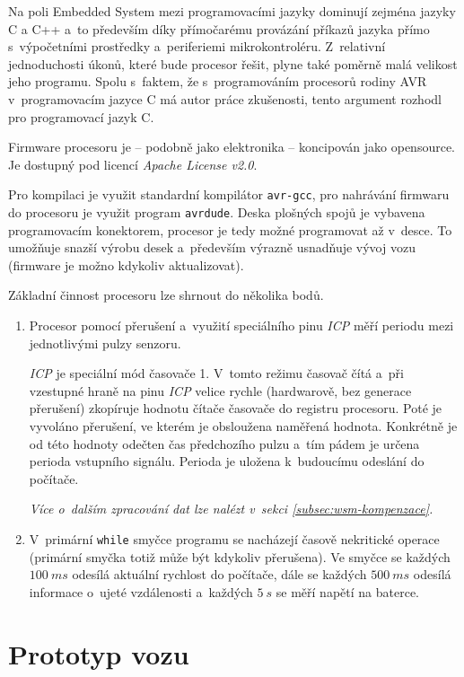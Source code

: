Na poli Embedded System mezi programovacími jazyky dominují zejména jazyky C a
C++ a~to především díky přímočarému provázání příkazů jazyka přímo
s~výpočetními prostředky a~periferiemi mikrokontroléru. Z~relativní
jednoduchosti úkonů, které bude procesor řešit, plyne také poměrně malá
velikost jeho programu. Spolu s~faktem, že s~programováním procesorů rodiny
AVR v~programovacím jazyce C má autor práce zkušenosti, tento argument rozhodl
pro programovací jazyk C.

Firmware procesoru je -- podobně jako elektronika -- koncipován jako
opensource. Je dostupný \cite{wsm-fw} pod licencí \textit{Apache License v2.0}.

Pro kompilaci je využit standardní kompilátor \texttt{avr-gcc}, pro nahrávání
firmwaru do procesoru je využit program \texttt{avrdude}. Deska
plošných spojů je vybavena programovacím konektorem, procesor je tedy možné
programovat až v~desce. To umožňuje snazší výrobu desek a~především výrazně
usnadňuje vývoj vozu (firmware je možno kdykoliv aktualizovat).

Základní činnost procesoru lze shrnout do několika bodů.

\begin{enumerate}
\item Procesor pomocí přerušení a~využití speciálního pinu \textit{ICP}
měří periodu mezi jednotlivými pulzy senzoru.

\textit{ICP} je speciální mód časovače 1. V~tomto režimu časovač čítá a~při
vzestupné hraně na pinu \textit{ICP} velice rychle (hardwarově, bez generace
přerušení) zkopíruje hodnotu čítače časovače do registru procesoru. Poté je
vyvoláno přerušení, ve kterém je obsloužena naměřená hodnota. Konkrétně je od
této hodnoty odečten čas předchozího pulzu a~tím pádem je určena perioda
vstupního signálu. Perioda je uložena k~budoucímu odeslání do počítače.

\textit{Více o~dalším zpracování dat lze nalézt v~sekci
\ref{subsec:wsm-kompenzace}.}

\item V~primární \texttt{while} smyčce programu se nacházejí časově nekritické
operace (primární smyčka totiž může být kdykoliv přerušena). Ve
smyčce se každých $100\ ms$ odesílá aktuální rychlost do počítače, dále se každých
$500\ ms$ odesílá informace o~ujeté vzdálenosti a~každých $5\ s$ se měří napětí
na baterce.

\end{enumerate}

\section{Prototyp vozu}
\label{sec:wsm-prototype}

